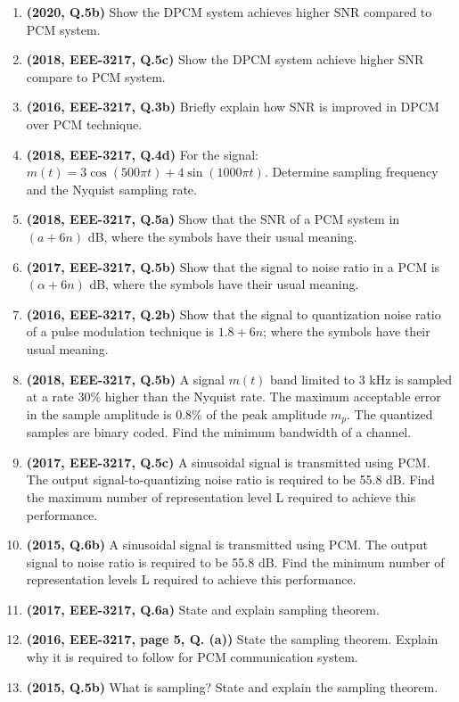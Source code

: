 \documentclass[12pt, a4paper]{article}
\begin{document}
\begin{enumerate}
		\item \textbf{(2020, Q.5b)} Show the DPCM system achieves higher SNR compared to PCM system.
		\item \textbf{(2018, EEE-3217, Q.5c)} Show the DPCM system achieve higher SNR compare to PCM system.
		\item \textbf{(2016, EEE-3217, Q.3b)} Briefly explain how SNR is improved in DPCM over PCM technique.
		
		\item \textbf{(2018, EEE-3217, Q.4d)} For the signal: $m(t) = 3\cos(500\pi t) + 4\sin(1000\pi t)$. Determine sampling frequency and the Nyquist sampling rate.
		
		\item \textbf{(2018, EEE-3217, Q.5a)} Show that the SNR of a PCM system in $(a + 6n)$ dB, where the symbols have their usual meaning.
		\item \textbf{(2017, EEE-3217, Q.5b)} Show that the signal to noise ratio in a PCM is $(\alpha + 6n)$ dB, where the symbols have their usual meaning.
		\item \textbf{(2016, EEE-3217, Q.2b)} Show that the signal to quantization noise ratio of a pulse modulation technique is $1.8 + 6n$; where the symbols have their usual meaning.
		
		\item \textbf{(2018, EEE-3217, Q.5b)} A signal $m(t)$ band limited to 3 kHz is sampled at a rate 30\% higher than the Nyquist rate. The maximum acceptable error in the sample amplitude is 0.8\% of the peak amplitude $m_p$. The quantized samples are binary coded. Find the minimum bandwidth of a channel.
		
		\item \textbf{(2017, EEE-3217, Q.5c)} A sinusoidal signal is transmitted using PCM. The output signal-to-quantizing noise ratio is required to be 55.8 dB. Find the maximum number of representation level L required to achieve this performance.
		\item \textbf{(2015, Q.6b)} A sinusoidal signal is transmitted using PCM. The output signal to noise ratio is required to be 55.8 dB. Find the minimum number of representation levels L required to achieve this performance.
		
		\item \textbf{(2017, EEE-3217, Q.6a)} State and explain sampling theorem.
		\item \textbf{(2016, EEE-3217, page 5, Q. (a))} State the sampling theorem. Explain why it is required to follow for PCM communication system.
		\item \textbf{(2015, Q.5b)} What is sampling? State and explain the sampling theorem.
		

\end{enumerate}
\end{document}
